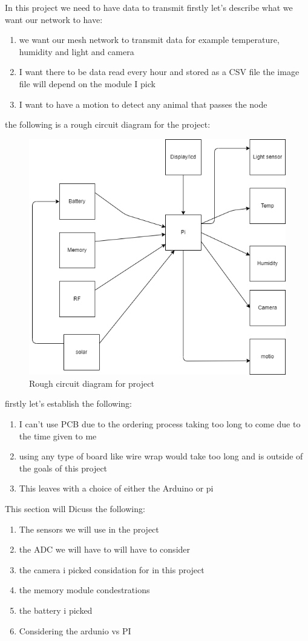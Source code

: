 In this project we need to have data to transmit firstly let's describe what we want our network to have:
\begin{enumerate}
	\item we want our mesh network to transmit  data for  example  temperature, humidity and  light and camera
	\item I want there to  be data read every hour  and  stored  as a CSV file  the image file  will depend on the module I pick
	\item I want to have a  motion to  detect  any animal that passes  the  node 
\end{enumerate}
\newpage
the following is  a  rough circuit diagram  for the project:
\begin{figure}[h!]
	\centering
	\includegraphics[width=0.5\linewidth]{Images/block_diagram_for_mesh_device.png}
	\caption{Rough circuit diagram for project}
	\label{Rough circuit diagram for project}
\end{figure}
firstly let's establish the following:
\begin{enumerate}
	\item I can't use  PCB due to  the ordering process taking too long to come due to the  time given  to me 
	\item using any  type of board like wire wrap  would take too long and is  outside of  the  goals of this project
	\item This leaves with  a  choice of either the  Arduino or pi
\end{enumerate}
This  section will Dicuss the following:
\begin{enumerate}
	\item The sensors we will use in the project
	\item the ADC we will have  to will have to  consider
	\item the camera i picked considation  for  in this  project
	\item the memory module condestrations
	\item the battery i  picked
	\item Considering the ardunio vs PI
\end{enumerate}

